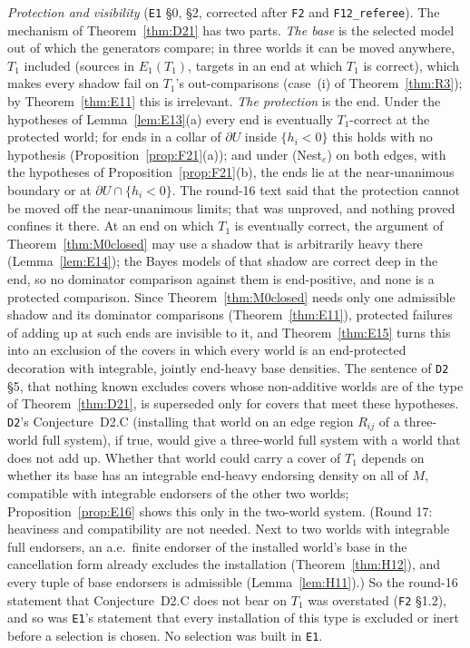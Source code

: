 \documentclass[11pt]{article}
\theoremstyle{definition}
\theoremstyle{remark}
\newcommand{\src}[1]{\texttt{#1}}
\begin{document}
\emph{Protection and visibility} (\src{E1} \S0, \S2, corrected after \src{F2} and \src{F12\_referee}). The mechanism of Theorem~\ref{thm:D21} has two parts. \emph{The base} is the selected model out of which the generators compare; in three worlds it can be moved anywhere, $T_1$ included (sources in $E_1(T_1)$, targets in an end at which $T_1$ is correct), which makes every shadow fail on $T_1$'s out-comparisons (case~(i) of Theorem~\ref{thm:R3}); by Theorem~\ref{thm:E11} this is irrelevant. \emph{The protection} is the end. Under the hypotheses of Lemma~\ref{lem:E13}(a) every end is eventually $T_1$-correct at the protected world; for ends in a collar of $\partial U$ inside $\{h_i<0\}$ this holds with no hypothesis (Proposition~\ref{prop:F21}(a)); and under (Nest$_e$) on both edges, with the hypotheses of Proposition~\ref{prop:F21}(b), the ends lie at the near-unanimous boundary or at $\partial U\cap\{h_i<0\}$. The round-16 text said that the protection cannot be moved off the near-unanimous limits; that was unproved, and nothing proved confines it there. At an end on which $T_1$ is eventually correct, the argument of Theorem~\ref{thm:M0closed} may use a shadow that is arbitrarily heavy there (Lemma~\ref{lem:E14}); the Bayes models of that shadow are correct deep in the end, so no dominator comparison against them is end-positive, and none is a protected comparison. Since Theorem~\ref{thm:M0closed} needs only one admissible shadow and its dominator comparisons (Theorem~\ref{thm:E11}), protected failures of adding up at such ends are invisible to it, and Theorem~\ref{thm:E15} turns this into an exclusion of the covers in which every world is an end-protected decoration with integrable, jointly end-heavy base densities. The sentence of \src{D2} \S5, that nothing known excludes covers whose non-additive worlds are of the type of Theorem~\ref{thm:D21}, is superseded only for covers that meet these hypotheses. \src{D2}'s Conjecture~D2.C (installing that world on an edge region $R_{ij}$ of a three-world full system), if true, would give a three-world full system with a world that does not add up. Whether that world could carry a cover of $T_1$ depends on whether its base has an integrable end-heavy endorsing density on all of $M$, compatible with integrable endorsers of the other two worlds; Proposition~\ref{prop:E16} shows this only in the two-world system. (Round 17: heaviness and compatibility are not needed. Next to two worlds with integrable full endorsers, an a.e.\ finite endorser of the installed world's base in the cancellation form already excludes the installation (Theorem~\ref{thm:H12}), and every tuple of base endorsers is admissible (Lemma~\ref{lem:H11}).) So the round-16 statement that Conjecture~D2.C does not bear on $T_1$ was overstated (\src{F2} \S1.2), and so was \src{E1}'s statement that every installation of this type is excluded or inert before a selection is chosen. No selection was built in \src{E1}.
\end{document}
